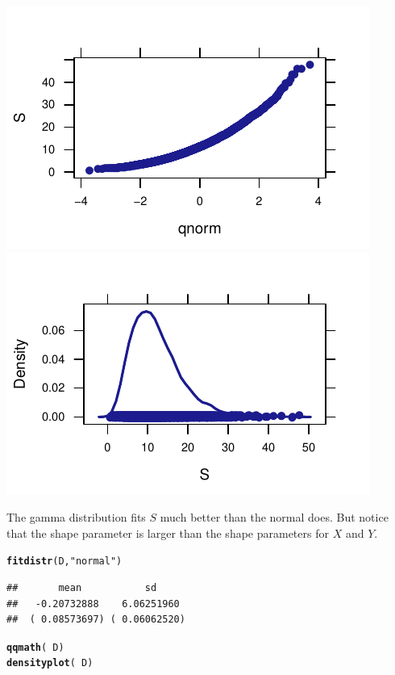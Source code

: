 \documentclass[twoside]{book}\usepackage[]{graphicx}\usepackage[]{xcolor}
\makeatletter
\def\maxwidth{ %
  \ifdim\Gin@nat@width>\linewidth
    \linewidth
  \else
    \Gin@nat@width
  \fi
}
\newcommand{\hlstr}[1]{\textcolor[rgb]{0.192,0.494,0.8}{#1}}%
\newcommand{\hlopt}[1]{\textcolor[rgb]{0,0,0}{#1}}%
\newcommand{\hlstd}[1]{\textcolor[rgb]{0.345,0.345,0.345}{#1}}%
\newcommand{\hlkwd}[1]{\textcolor[rgb]{0.737,0.353,0.396}{\textbf{#1}}}%
\newenvironment{kframe}{%
 \def\at@end@of@kframe{}%
 \ifinner\ifhmode%
  \def\at@end@of@kframe{\end{minipage}}%
  \begin{minipage}{\columnwidth}%
 \fi\fi%
 \def\FrameCommand##1{\hskip\@totalleftmargin \hskip-\fboxsep
 \colorbox{shadecolor}{##1}\hskip-\fboxsep
     \hskip-\linewidth \hskip-\@totalleftmargin \hskip\columnwidth}%
 \MakeFramed {\advance\hsize-\width
   \@totalleftmargin\z@ \linewidth\hsize
   \@setminipage}}%
 {\par\unskip\endMakeFramed%
 \at@end@of@kframe}
\newenvironment{knitrout}{}{} %
\makeatother
\begin{document}
\begin{solution}
\begin{knitrout}
{\centering \includegraphics[width=\maxwidth]{figures/fig-unnamed-chunk-138-1} 
\includegraphics[width=\maxwidth]{figures/fig-unnamed-chunk-138-2} 

}



\end{knitrout}
The gamma distribution fits $S$ much better than the normal does.  But notice that the 
shape parameter is larger than the shape parameters for $X$ and $Y$.

\begin{knitrout}
\color{fgcolor}\begin{kframe}
\begin{alltt}
\hlkwd{fitdistr}\hlstd{( D,} \hlstr{"normal"}\hlstd{)}
\end{alltt}
\begin{verbatim}
##       mean           sd     
##   -0.20732888    6.06251960 
##  ( 0.08573697) ( 0.06062520)
\end{verbatim}
\begin{alltt}
\hlkwd{qqmath}\hlstd{(} \hlopt{~} \hlstd{D )}
\hlkwd{densityplot}\hlstd{(} \hlopt{~} \hlstd{D )}
\end{alltt}
\end{kframe}


\end{knitrout}
\end{solution}
\end{document}
